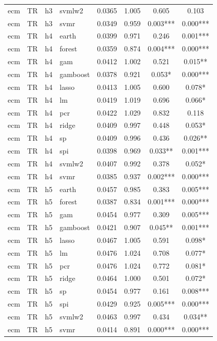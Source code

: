 \begin{ThreePartTable}
\begin{longtable}[t]{llclcccc}
ecm & TR & h3 & svmlw2 & 0.0365 & 1.005 & 0.605 & 0.103\\
ecm & TR & h3 & svmr & 0.0349 & 0.959 & 0.003*** & 0.000***\\
\addlinespace
ecm & TR & h4 & earth & 0.0399 & 0.971 & 0.246 & 0.001***\\
ecm & TR & h4 & forest & 0.0359 & 0.874 & 0.004*** & 0.000***\\
ecm & TR & h4 & gam & 0.0412 & 1.002 & 0.521 & 0.015**\\
ecm & TR & h4 & gamboost & 0.0378 & 0.921 & 0.053* & 0.000***\\
ecm & TR & h4 & lasso & 0.0413 & 1.005 & 0.600 & 0.078*\\
ecm & TR & h4 & lm & 0.0419 & 1.019 & 0.696 & 0.066*\\
ecm & TR & h4 & pcr & 0.0422 & 1.029 & 0.832 & 0.118\\
ecm & TR & h4 & ridge & 0.0409 & 0.997 & 0.448 & 0.053*\\
ecm & TR & h4 & sp & 0.0409 & 0.996 & 0.436 & 0.026**\\
ecm & TR & h4 & spi & 0.0398 & 0.969 & 0.033** & 0.001***\\
ecm & TR & h4 & svmlw2 & 0.0407 & 0.992 & 0.378 & 0.052*\\
ecm & TR & h4 & svmr & 0.0385 & 0.937 & 0.002*** & 0.000***\\
\addlinespace
ecm & TR & h5 & earth & 0.0457 & 0.985 & 0.383 & 0.005***\\
ecm & TR & h5 & forest & 0.0387 & 0.834 & 0.001*** & 0.000***\\
ecm & TR & h5 & gam & 0.0454 & 0.977 & 0.309 & 0.005***\\
ecm & TR & h5 & gamboost & 0.0421 & 0.907 & 0.045** & 0.001***\\
ecm & TR & h5 & lasso & 0.0467 & 1.005 & 0.591 & 0.098*\\
ecm & TR & h5 & lm & 0.0476 & 1.024 & 0.708 & 0.077*\\
ecm & TR & h5 & pcr & 0.0476 & 1.024 & 0.772 & 0.081*\\
ecm & TR & h5 & ridge & 0.0464 & 1.000 & 0.501 & 0.072*\\
ecm & TR & h5 & sp & 0.0454 & 0.977 & 0.161 & 0.008***\\
ecm & TR & h5 & spi & 0.0429 & 0.925 & 0.005*** & 0.000***\\
ecm & TR & h5 & svmlw2 & 0.0463 & 0.997 & 0.434 & 0.034**\\
ecm & TR & h5 & svmr & 0.0414 & 0.891 & 0.000*** & 0.000***\\

\end{longtable}
\end{ThreePartTable}
